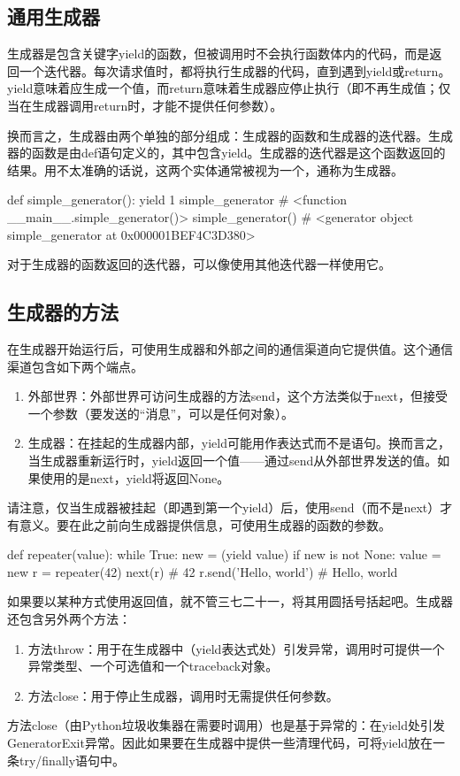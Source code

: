 \subsection{通用生成器}
生成器是包含关键字yield的函数，但被调用时不会执行函数体内的代码，而是返回一个迭代器。每次请求值时，都将执行生成器的代码，直到遇到yield或return。yield意味着应生成一个值，而return意味着生成器应停止执行（即不再生成值；仅当在生成器调用return时，才能不提供任何参数）。

换而言之，生成器由两个单独的部分组成：生成器的函数和生成器的迭代器。生成器的函数是由def语句定义的，其中包含yield。生成器的迭代器是这个函数返回的结果。用不太准确的话说，这两个实体通常被视为一个，通称为生成器。
\begin{pyc}
def simple_generator():
    yield 1
simple_generator
# <function __main__.simple_generator()>
simple_generator()
# <generator object simple_generator at 0x000001BEF4C3D380>
\end{pyc}
对于生成器的函数返回的迭代器，可以像使用其他迭代器一样使用它。

\subsection{生成器的方法}
在生成器开始运行后，可使用生成器和外部之间的通信渠道向它提供值。这个通信渠道包含如下两个端点。
\begin{enumerate}
\item 外部世界：外部世界可访问生成器的方法send，这个方法类似于next，但接受一个参数（要发送的“消息”，可以是任何对象）。
\item 生成器：在挂起的生成器内部，yield可能用作表达式而不是语句。换而言之，当生成器重新运行时，yield返回一个值——通过send从外部世界发送的值。如果使用的是next，yield将返回None。
\end{enumerate}
请注意，仅当生成器被挂起（即遇到第一个yield）后，使用send（而不是next）才有意义。要在此之前向生成器提供信息，可使用生成器的函数的参数。
\begin{pyc}
def repeater(value):
    while True:
        new = (yield value)
        if new is not None:
            value = new
r = repeater(42)
next(r)  # 42
r.send('Hello, world')  # Hello, world
\end{pyc}
如果要以某种方式使用返回值，就不管三七二十一，将其用圆括号括起吧。生成器还包含另外两个方法：
\begin{enumerate}
\item 方法throw：用于在生成器中（yield表达式处）引发异常，调用时可提供一个异常类型、一个可选值和一个traceback对象。
\item 方法close：用于停止生成器，调用时无需提供任何参数。
\end{enumerate}
方法close（由Python垃圾收集器在需要时调用）也是基于异常的：在yield处引发GeneratorExit异常。因此如果要在生成器中提供一些清理代码，可将yield放在一条try/finally语句中。
